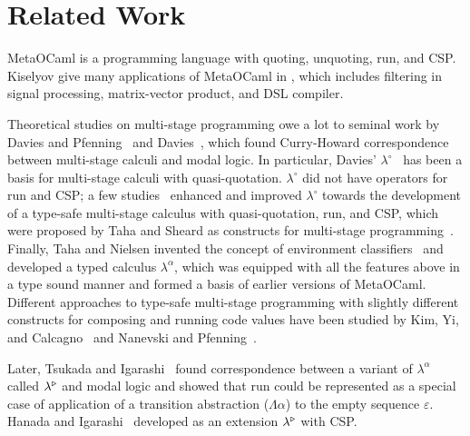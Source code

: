 
\section{Related Work}
\label{sec:related-work}

MetaOCaml is a programming language with quoting, unquoting, run, and
CSP.  Kiselyov give many applications of MetaOCaml in \cite{8384206},
which includes filtering in signal processing, matrix-vector product,
and DSL compiler.  


Theoretical studies on multi-stage programming owe a lot to seminal
work by Davies and Pfenning~\cite{DaviesPfenning01JACM} and
Davies~\cite{davies1996temporal}, which found Curry-Howard
correspondence between multi-stage calculi and modal logic.  In
particular, Davies' $\lambda^\circ$~\cite{davies1996temporal} has been
a basis for multi-stage calculi with quasi-quotation.  $\lambda^\circ$
did not have operators for run and CSP; a few
studies~\cite{benaissa1999logical,MoggiTahaBenaissaSheard99ESOP}
enhanced and improved $\lambda^\circ$ towards the development of a
type-safe multi-stage calculus with quasi-quotation, run, and CSP,
which were proposed by Taha and Sheard as constructs for multi-stage
programming~\cite{MetaML}.
Finally, Taha and Nielsen invented the concept of environment
classifiers~\cite{taha2003environment} and developed a typed calculus
$\lambda^\alpha$, which was equipped with all the features above in a
type sound manner and formed a basis of earlier versions of MetaOCaml.
Different approaches to type-safe multi-stage programming with
slightly different constructs for composing and running code values have been studied by Kim, Yi,
and Calcagno~\cite{DBLP:conf/popl/KimYC06} and Nanevski and Pfenning~\cite{DBLP:journals/jfp/NanevskiP05}.

Later, Tsukada and Igarashi~\cite{Tsukada} found correspondence
between a variant of \(\lambda^\alpha\) called $\lambda^{\mathop{\triangleright}}$
and modal logic and showed that run could be represented as a special
case of application of a transition abstraction ($\Lambda\alpha$) to
the empty sequence $\varepsilon$.  Hanada and
Igarashi~\cite{Hanada2014} developed \LTP as an extension
$\lambda^{\mathop{\triangleright}}$ with CSP.

